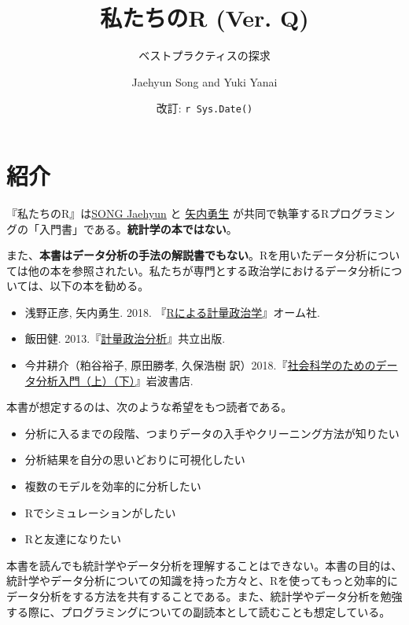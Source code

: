 \documentclass[
  a4paper,
  pandoc,
  ja=standard,
  jafont=haranoaji]{bxjsbook}
\title{私たちのR (Ver. Q)}
\subtitle{ベストプラクティスの探求}
\author{Jaehyun Song and Yuki Yanai}
\date{改訂: \texttt{r\ Sys.Date()}}
\providecommand{\tightlist}{%
  \setlength{\itemsep}{0pt}\setlength{\parskip}{0pt}}
\renewcommand*\contentsname{目次}
\begin{document}
\maketitle

\renewcommand*\contentsname{目次}
{
\hypersetup{linkcolor=}
\setcounter{tocdepth}{2}
\tableofcontents
}
\hypertarget{ux7d39ux4ecb}{%
\chapter*{紹介}\label{ux7d39ux4ecb}}

『私たちのR』は\href{http://www.jaysong.net/}{SONG Jaehyun} と
\href{https://yukiyanai.github.io}{矢内勇生}
が共同で執筆するRプログラミングの「入門書」である。\textbf{統計学の本ではない}。

また、\textbf{本書はデータ分析の手法の解説書でもない}。Rを用いたデータ分析については他の本を参照されたい。私たちが専門とする政治学におけるデータ分析については、以下の本を勧める。

\begin{itemize}
\tightlist
\item
  浅野正彦, 矢内勇生. 2018.
  『\href{https://www.ohmsha.co.jp/book/9784274223136/}{Rによる計量政治学}』オーム社.
\item
  飯田健.
  2013.『\href{https://www.kyoritsu-pub.co.jp/bookdetail/9784320019249}{計量政治分析}』共立出版.
\item
  今井耕介（粕谷裕子, 原田勝孝, 久保浩樹
  訳）2018.『\href{https://www.iwanami.co.jp/book/b352348.html}{社会科学のためのデータ分析入門（上）（下）}』岩波書店.
\end{itemize}

本書が想定するのは、次のような希望をもつ読者である。

\begin{itemize}
\tightlist
\item
  分析に入るまでの段階、つまりデータの入手やクリーニング方法が知りたい
\item
  分析結果を自分の思いどおりに可視化したい
\item
  複数のモデルを効率的に分析したい
\item
  Rでシミュレーションがしたい
\item
  Rと友達になりたい
\end{itemize}

本書を読んでも統計学やデータ分析を理解することはできない。本書の目的は、統計学やデータ分析についての知識を持った方々と、Rを使ってもっと効率的にデータ分析をする方法を共有することである。また、統計学やデータ分析を勉強する際に、プログラミングについての副読本として読むことも想定している。
\end{document}
